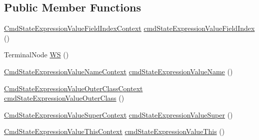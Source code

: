 \subsection*{Public Member Functions}
\begin{DoxyCompactItemize}
\item 
\hyperlink{classgov_1_1nasa_1_1jpf_1_1inspector_1_1server_1_1expression_1_1parser_1_1_expression_grammar_pa31d705710a4d9acddfdd67c37ac04c8a}{Cmd\+State\+Expression\+Value\+Field\+Index\+Context} \hyperlink{classgov_1_1nasa_1_1jpf_1_1inspector_1_1server_1_1expression_1_1parser_1_1_expression_grammar_pa672388ef0800b4a3d173ab7548f6b406_a25d2ecdb0ffca9146662a99caf7affb0}{cmd\+State\+Expression\+Value\+Field\+Index} ()
\item 
Terminal\+Node \hyperlink{classgov_1_1nasa_1_1jpf_1_1inspector_1_1server_1_1expression_1_1parser_1_1_expression_grammar_pa672388ef0800b4a3d173ab7548f6b406_a9ca28e75cce814c1bcf3f18894c2cc01}{WS} ()
\item 
\hyperlink{classgov_1_1nasa_1_1jpf_1_1inspector_1_1server_1_1expression_1_1parser_1_1_expression_grammar_pa79fe925a020ecc7299d05e3047f2cfe9}{Cmd\+State\+Expression\+Value\+Name\+Context} \hyperlink{classgov_1_1nasa_1_1jpf_1_1inspector_1_1server_1_1expression_1_1parser_1_1_expression_grammar_pa672388ef0800b4a3d173ab7548f6b406_ac95b61d61ae22d017c519f53381e42b4}{cmd\+State\+Expression\+Value\+Name} ()
\item 
\hyperlink{classgov_1_1nasa_1_1jpf_1_1inspector_1_1server_1_1expression_1_1parser_1_1_expression_grammar_paa97aac802c11881ff9166c765f4fc61a}{Cmd\+State\+Expression\+Value\+Outer\+Class\+Context} \hyperlink{classgov_1_1nasa_1_1jpf_1_1inspector_1_1server_1_1expression_1_1parser_1_1_expression_grammar_pa672388ef0800b4a3d173ab7548f6b406_a303a7eb79cecaebe6dcd35773f3d244b}{cmd\+State\+Expression\+Value\+Outer\+Class} ()
\item 
\hyperlink{classgov_1_1nasa_1_1jpf_1_1inspector_1_1server_1_1expression_1_1parser_1_1_expression_grammar_pa66c003646cac4c60d53e10c6587465ef}{Cmd\+State\+Expression\+Value\+Super\+Context} \hyperlink{classgov_1_1nasa_1_1jpf_1_1inspector_1_1server_1_1expression_1_1parser_1_1_expression_grammar_pa672388ef0800b4a3d173ab7548f6b406_aa844321e30025b59421adaf24e004118}{cmd\+State\+Expression\+Value\+Super} ()
\item 
\hyperlink{classgov_1_1nasa_1_1jpf_1_1inspector_1_1server_1_1expression_1_1parser_1_1_expression_grammar_pa5c670e8752735864512a29116a6ade67}{Cmd\+State\+Expression\+Value\+This\+Context} \hyperlink{classgov_1_1nasa_1_1jpf_1_1inspector_1_1server_1_1expression_1_1parser_1_1_expression_grammar_pa672388ef0800b4a3d173ab7548f6b406_abfcb1683c23631992bf414b081c4f92d}{cmd\+State\+Expression\+Value\+This} ()

\end{DoxyCompactItemize}
